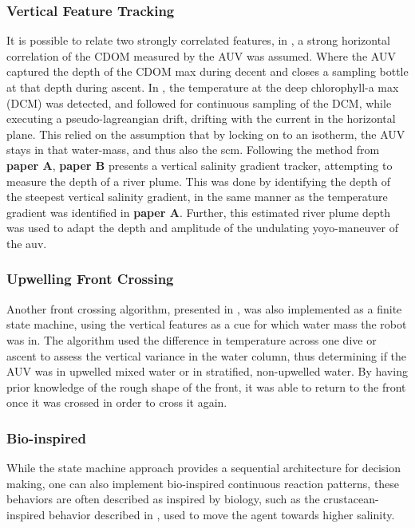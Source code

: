 \subsubsection*{Vertical Feature Tracking}
It is possible to relate two strongly correlated features, in \textcite{zhang2011peak}, a strong horizontal correlation of the CDOM measured by the AUV was assumed. Where the AUV captured the depth of the CDOM max during decent and closes a sampling bottle at that depth during ascent. In \cite{zhang2019autonomous}, the temperature at the deep chlorophyll-a max (DCM) was detected, and followed for continuous sampling of the DCM, while executing a pseudo-lagreangian drift, drifting with the current in the horizontal plane. This relied on the assumption that by locking on to an isotherm, the AUV stays in  that water-mass, and thus also the \acrshort{scm}. Following the method from \textbf{paper A}, \textbf{paper B} presents a vertical salinity gradient tracker, attempting to measure the depth of a river plume. This was done by identifying the depth of the steepest vertical salinity gradient, in the same manner as the temperature gradient was identified in \textbf{paper A}. Further, this estimated river plume depth was used to adapt the depth and amplitude of the undulating yoyo-maneuver of the \acrshort{auv}.


\subsubsection*{Upwelling Front Crossing}
Another front crossing algorithm, presented in \textcite{zhang2012autonomous,zhang2013two,zhang2016autonomous}, was also implemented as a finite state machine, using the vertical features as a cue for which water mass the robot was in. The algorithm used the difference in temperature across one dive or ascent to assess the vertical variance in the water column, thus determining if the AUV was in upwelled mixed water or in stratified, non-upwelled water. By having prior knowledge of the rough shape of the front, it was able to return to the front once it was crossed in order to cross it again. 


\subsubsection*{Bio-inspired}
While the state machine approach provides a sequential architecture for decision making, one can also implement bio-inspired continuous reaction patterns, these behaviors are often described as inspired by biology, such as the crustacean-inspired behavior described in \cite{hwang2019auv}, used to move the agent towards higher salinity. 



